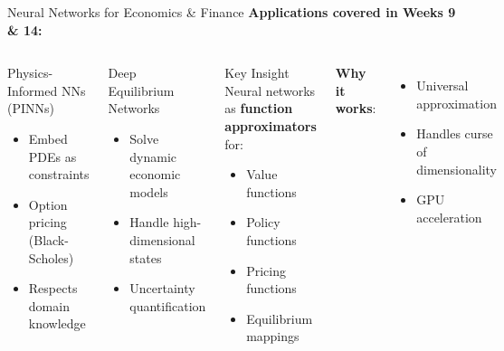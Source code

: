 \documentclass[aspectratio=169,11pt]{beamer}
\begin{document}
\begin{frame}{Neural Networks for Economics \& Finance}
\textbf{Applications covered in Weeks 9 \& 14:}

\begin{columns}
\begin{block}{Physics-Informed NNs (PINNs)}
\begin{itemize}
    \item Embed PDEs as constraints
    \item Option pricing (Black-Scholes)
    \item Respects domain knowledge
\end{itemize}
\end{block}

\begin{block}{Deep Equilibrium Networks}
\begin{itemize}
    \item Solve dynamic economic models
    \item Handle high-dimensional states
    \item Uncertainty quantification
\end{itemize}
\end{block}

\begin{block}{Key Insight}
Neural networks as \textbf{function approximators} for:
\begin{itemize}
    \item Value functions
    \item Policy functions
    \item Pricing functions
    \item Equilibrium mappings
\end{itemize}
\end{block}

\vspace{0.5em}
\textbf{Why it works}:
\begin{itemize}
    \item Universal approximation
    \item Handles curse of dimensionality
    \item GPU acceleration
\end{itemize}
\end{columns}
\end{frame}

\end{document}
